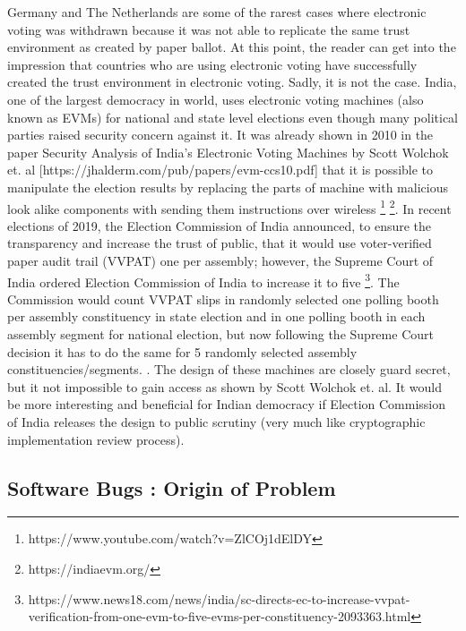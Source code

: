   
  Germany and The Netherlands are some of the rarest cases where 
  electronic voting was withdrawn because it was not able to 
  replicate the same trust environment as created by paper ballot.
  At this point, the reader can get into the impression that 
  countries who are using electronic voting have successfully 
  created the trust environment in electronic voting. Sadly, 
  it is not the case. India, one of the largest democracy in world, 
  uses electronic voting machines (also known as EVMs) for national 
  and state level 
  elections even though many political parties raised security 
  concern against it.
  It was already shown in 2010 in the paper 
  Security Analysis of India's Electronic Voting Machines by 
  Scott Wolchok et. al 
  [https://jhalderm.com/pub/papers/evm-ccs10.pdf] that it 
  is possible to manipulate the election results by replacing the 
  parts of machine with malicious look alike components with sending 
  them instructions over wireless
  \footnote{https://www.youtube.com/watch?v=ZlCOj1dElDY} 
  \footnote{https://indiaevm.org/}. 
  In recent elections of 2019, the Election Commission of India 
  announced, to ensure the transparency and 
  increase the trust of public, that it would use 
  voter-verified paper audit trail (VVPAT) 
  one per assembly; however, the Supreme Court of India ordered Election 
  Commission of India to increase it to five
  \footnote{https://www.news18.com/news/india/sc-directs-ec-to-increase-vvpat-verification-from-one-evm-to-five-evms-per-constituency-2093363.html}.
  The Commission  would count VVPAT slips 
  in randomly selected one polling booth per assembly 
  constituency in state election and 
  in one polling booth in each assembly segment for national election, but 
  now following the Supreme Court decision it has to do the same for 
  5 randomly selected assembly constituencies/segments. 
  . The design of these 
  machines are closely guard secret,  but it not impossible to gain 
  access as shown by  Scott Wolchok et. al. It would be more 
  interesting and beneficial for Indian democracy if Election 
  Commission of India
  releases the design to public scrutiny (very much like cryptographic
  implementation review process).
  
  
  
 
  
    
  
   
   \subsection{Software Bugs : Origin of Problem}
   
